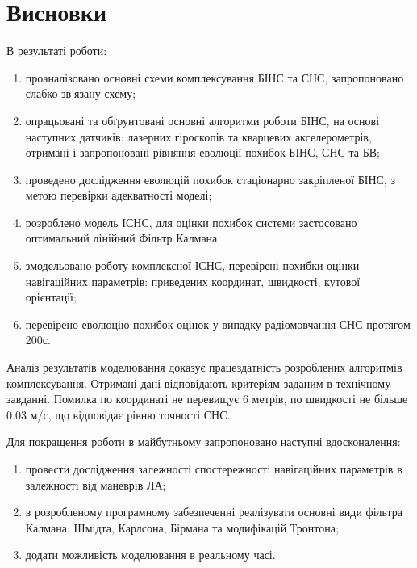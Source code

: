 \section*{Висновки} 
В результаті роботи:
\begin{enumerate}
 \item проаналізовано основні схеми комплексування БІНС та СНС, запропоновано слабко зв’язану схему;
 \item опрацьовані та обґрунтовані основні алгоритми роботи БІНС, на основі наступних датчиків: лазерних гіроскопів та кварцевих акселерометрів, отримані і запропоновані рівняння еволюції похибок БІНС, СНС та БВ;
 \item проведено дослідження еволюцій похибок стаціонарно закріпленої БІНС, з метою перевірки адекватності моделі;
 \item розроблено модель ІСНС, для оцінки похибок системи застосовано оптимальний лінійний Фільтр Калмана;
 \item змодельовано роботу комплексної ІСНС,  перевірені похибки оцінки навігаційних параметрів: приведених координат, швидкості, кутової орієнтації;
 \item перевірено еволюцію похибок оцінок у випадку радіомовчання СНС протягом 200с.
\end{enumerate}

Аналіз результатів моделювання доказує працездатність розроблених алгоритмів комплексування. Отримані дані відповідають критеріям заданим в технічному завданні. Помилка по координаті не перевищує 6 метрів, по швидкості не більше 0.03 м/с, що відповідає рівню точності СНС.

Для покращення роботи в майбутньому запропоновано наступні вдосконалення:
\begin{enumerate}
 \item провести дослідження залежності спостережності навігаційних параметрів в залежності від маневрів ЛА;
 \item в розробленому програмному забезпеченні реалізувати основні види фільтра Калмана: Шмідта, Карлсона, Бірмана та модифікацій Тронтона;
 \item додати можливість моделювання в реальному часі.
\end{enumerate}